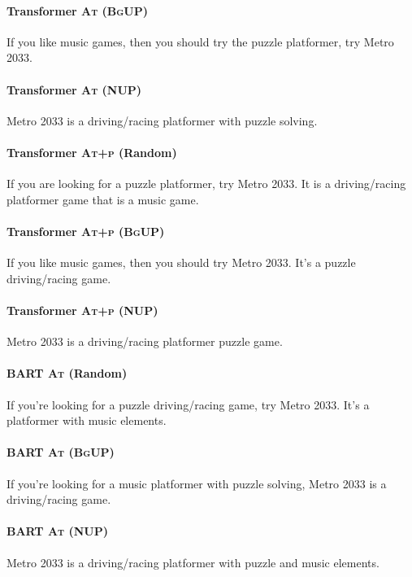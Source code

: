 \paragraph{Transformer \textsc{At (BgUP)}}
If you like music games, then you should try the puzzle platformer, try Metro 2033.

\paragraph{Transformer \textsc{At} (NUP)}
Metro 2033 is a driving/racing platformer with puzzle solving.

\paragraph{Transformer \textsc{At+p} (Random)}
If you are looking for a puzzle platformer, try Metro 2033. It is a driving/racing platformer game that is a music game.

\paragraph{Transformer \textsc{At+p (BgUP)}}
If you like music games, then you should try Metro 2033. It's a puzzle driving/racing game.

\paragraph{Transformer \textsc{At+p} (NUP)}
Metro 2033 is a driving/racing platformer puzzle game.

\paragraph{BART \textsc{At} (Random)}
If you're looking for a puzzle driving/racing game, try Metro 2033. It's a platformer with music elements.

\paragraph{BART \textsc{At (BgUP)}}
If you're looking for a music platformer with puzzle solving, Metro 2033 is a driving/racing game.

\paragraph{BART \textsc{At} (NUP)}
Metro 2033 is a driving/racing platformer with puzzle and music elements.

